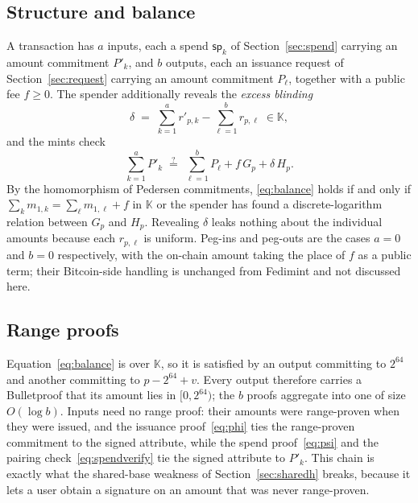 \documentclass[10pt,a5paper]{article}
\newcommand{\K}[1]{#1}                      %
\newcommand{\Go}[1]{#1}                     %
\newcommand{\K}[1]{{\color{ScalarCol}#1}}   %
\newcommand{\Go}[1]{{\color{GoneCol}#1}}    %
\newcommand{\F}{\mathbb{K}}
\newcommand{\eqq}{\stackrel{?}{=}}
\begin{document}
\subsection{Structure and balance}

A transaction has $a$ inputs, each a spend $\mathsf{sp}_k$ of
Section~\ref{sec:spend} carrying an amount commitment $\Go{P'_k}$, and $b$
outputs, each an issuance request of Section~\ref{sec:request} carrying an
amount commitment $\Go{P_\ell}$, together with a public fee $\K{f} \ge 0$. The
spender additionally reveals the \emph{excess blinding}
\begin{equation}
  \K{\delta} \;=\; \sum_{k=1}^{a} \K{r'_{p,k}} - \sum_{\ell=1}^{b} \K{r_{p,\ell}} \;\in \F,
  \label{eq:excess}
\end{equation}
and the mints check
\begin{equation}
  \sum_{k=1}^{a} \Go{P'_k} \;\eqq\; \sum_{\ell=1}^{b} \Go{P_\ell} + \K{f}\,\Go{G_p} + \K{\delta}\,\Go{H_p}.
  \label{eq:balance}
\end{equation}
By the homomorphism of Pedersen commitments, \eqref{eq:balance} holds if and
only if $\sum_k \K{m_{1,k}} = \sum_\ell \K{m_{1,\ell}} + \K{f}$ in $\F$ or the
spender has found a discrete-logarithm relation between $\Go{G_p}$ and
$\Go{H_p}$. Revealing $\K{\delta}$ leaks nothing about the individual amounts
because each $\K{r_{p,\ell}}$ is uniform. Peg-ins and peg-outs are the cases
$a = 0$ and $b = 0$ respectively, with the on-chain amount taking the place of
$\K{f}$ as a public term; their Bitcoin-side handling is unchanged from
Fedimint and not discussed here.

\subsection{Range proofs}

Equation~\eqref{eq:balance} is over $\F$, so it is satisfied by an output
committing to $2^{64}$ and another committing to $p - 2^{64} + \K{v}$. Every
output therefore carries a Bulletproof that its amount lies in $[0, 2^{64})$;
the $b$ proofs aggregate into one of size $O(\log b)$. Inputs need no range
proof: their amounts were range-proven when they were issued, and the issuance
proof~\eqref{eq:phi} ties the range-proven commitment to the signed attribute,
while the spend proof~\eqref{eq:psi} and the pairing
check~\eqref{eq:spendverify} tie the signed attribute to $\Go{P'_k}$. This
chain is exactly what the shared-base weakness of Section~\ref{sec:sharedh}
breaks, because it lets a user obtain a signature on an amount that was never
range-proven.
\end{document}

